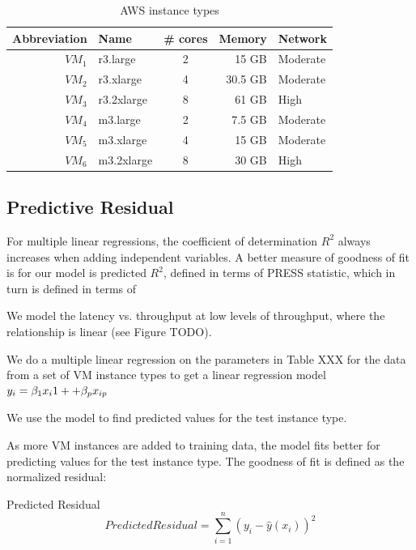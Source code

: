 \documentclass{acm_proc_article-sp}
\begin{document}
\begin{table}
\centering
\caption{AWS instance types}
\begin{tabular}{|r|l|c|r|l|} \hline
Abbreviation&Name& \# cores&Memory&Network\\ \hline
$VM_1$ & r3.large & 2 & 15 GB & Moderate\\ \hline
$VM_2$ & r3.xlarge & 4 & 30.5 GB & Moderate\\ \hline
$VM_3$ & r3.2xlarge & 8 & 61 GB & High\\ \hline
$VM_4$ & m3.large & 2 & 7.5 GB & Moderate\\ \hline
$VM_5$ & m3.xlarge & 4 & 15 GB & Moderate\\ \hline
$VM_6$ & m3.2xlarge & 8 & 30 GB & High\\ \hline
\hline\end{tabular}
\label{table:rdstypes}
\end{table}

\subsection{Predictive Residual}

For multiple linear regressions, the coefficient of determination $R^2$ always increases when adding independent variables.  A better measure of goodness of fit is for our model is predicted $R^2$, defined in terms of PRESS statistic, which in turn is defined in terms of 

We model the latency vs. throughput at low levels of throughput, where the relationship is linear (see Figure TODO).

We do a multiple linear regression on the parameters in Table XXX for the data from a set of VM instance types to get a linear regression model $y_i = \beta_1 x_i1+\dotfill+\beta_{p}x_{ip}$

We use the model to find predicted values for the test instance type.

As more VM instances are added to training data, the model fits better for predicting values for the test instance type.  The goodness of fit is defined as the normalized residual:

\begin{definition}
Predicted Residual
\begin{displaymath}{
Predicted Residual=\sum_{i=1}^{n} (y_i - \hat{y}(x_i))^{2}
}\end{displaymath}

\end{definition}
\end{document}
